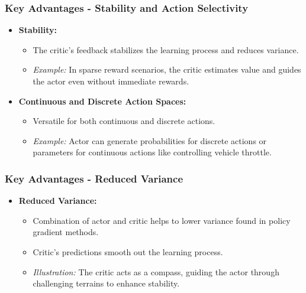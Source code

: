 \documentclass[aspectratio=169]{beamer}
\begin{document}
\begin{frame}[fragile]
    \frametitle{Key Advantages - Stability and Action Selectivity}
    \begin{itemize}
        \item \textbf{Stability:}
        \begin{itemize}
            \item The critic’s feedback stabilizes the learning process and reduces variance.
            \item \textit{Example:} In sparse reward scenarios, the critic estimates value and guides the actor even without immediate rewards.
        \end{itemize}
        
        \item \textbf{Continuous and Discrete Action Spaces:}
        \begin{itemize}
            \item Versatile for both continuous and discrete actions.
            \item \textit{Example:} Actor can generate probabilities for discrete actions or parameters for continuous actions like controlling vehicle throttle.
        \end{itemize}
    \end{itemize}
\end{frame}

\begin{frame}[fragile]
    \frametitle{Key Advantages - Reduced Variance}
    \begin{itemize}
        \item \textbf{Reduced Variance:}
        \begin{itemize}
            \item Combination of actor and critic helps to lower variance found in policy gradient methods.
            \item Critic’s predictions smooth out the learning process.
            \item \textit{Illustration:} The critic acts as a compass, guiding the actor through challenging terrains to enhance stability.
        \end{itemize}
    \end{itemize}
\end{frame}
\end{document}
